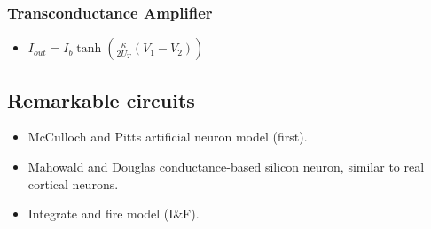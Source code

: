 \documentclass[a4paper, 12pt]{article}
\begin{document}
\subsubsection{Transconductance Amplifier}
\begin{itemize}[noitemsep,nolistsep]
	\item $I_{out}=I_b\tanh(\frac{\kappa}{2U_T}(V_1-V_2))$
\end{itemize}

\subsection{Remarkable circuits}
\begin{itemize}[noitemsep,nolistsep]
	\item McCulloch and Pitts artificial neuron model (first).
	\item Mahowald and Douglas conductance-based silicon neuron, similar to real cortical neurons.
	\item Integrate and fire model (I\&F).
\end{itemize}
\end{document}
